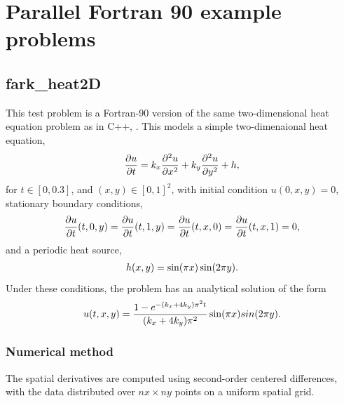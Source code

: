 \documentclass[letterpaper,10pt,english]{sphinxmanual}
\begin{document}
\chapter{Parallel Fortran 90 example problems}
\label{f90_parallel:parallel-fortran-90-example-problems}\label{f90_parallel::doc}\label{f90_parallel:parallel-f90}

\section{fark\_heat2D}
\label{f90_parallel:fark-heat2d}\label{f90_parallel:id1}
This test problem is a Fortran-90 version of the same two-dimensional
heat equation problem as in C++, {\hyperref[cpp_parallel:ark-heat2d]{\emph{}}}.  This models a
simple two-dimenaional heat equation,
\begin{gather}
\begin{split}\frac{\partial u}{\partial t} = k_x \frac{\partial^2 u}{\partial x^2}
                              + k_y \frac{\partial^2 u}{\partial y^2} + h,\end{split}\notag
\end{gather}
for \(t \in [0, 0.3]\), and \((x,y) \in [0, 1]^2\), with initial
condition \(u(0,x,y) = 0\), stationary boundary conditions,
\begin{gather}
\begin{split}\frac{\partial u}{\partial t}(t,0,y) = \frac{\partial u}{\partial t}(t,1,y) =
\frac{\partial u}{\partial t}(t,x,0) = \frac{\partial u}{\partial t}(t,x,1) = 0,\end{split}\notag
\end{gather}
and a periodic heat source,
\begin{gather}
\begin{split}h(x,y) = \sin(\pi x) \sin(2\pi y).\end{split}\notag
\end{gather}
Under these conditions, the problem has an analytical solution of the
form
\begin{gather}
\begin{split}u(t,x,y) = \frac{1 - e^{-(k_x+4k_y)\pi^2 t}}{(k_x+4k_y)\pi^2} \sin(\pi x) sin(2\pi y).\end{split}\notag
\end{gather}

\subsection{Numerical method}
\label{f90_parallel:numerical-method}
The spatial derivatives are computed using second-order centered
differences, with the data distributed over \(nx\times ny\) points
on a uniform spatial grid.
\end{document}
